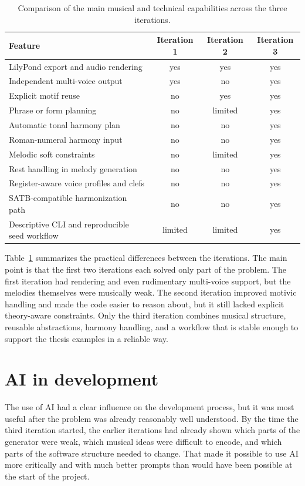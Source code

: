   \begin{table}[h]
    \centering
    \small
    \begin{tabular}{p{}ccc}
      \toprule
      Feature & Iteration 1 & Iteration 2 & Iteration 3 \\
      \midrule
      LilyPond export and audio rendering & yes & yes & yes \\
      Independent multi-voice output & yes & no & yes \\
      Explicit motif reuse & no & yes & yes \\
      Phrase or form planning & no & limited & yes \\
      Automatic tonal harmony plan & no & no & yes \\
      Roman-numeral harmony input & no & no & yes \\
      Melodic soft constraints & no & limited & yes \\
      Rest handling in melody generation & no & no & yes \\
      Register-aware voice profiles and clefs & no & no & yes \\
      SATB-compatible harmonization path & no & no & yes \\
      Descriptive CLI and reproducible seed workflow & limited & limited & yes \\
      \bottomrule
    \end{tabular}
    \caption{Comparison of the main musical and technical capabilities across the three iterations.}\label{tab:iteration_feature_matrix}
  \end{table}

  Table~\ref{tab:iteration_feature_matrix} summarizes the practical differences between the iterations. The main point is that the first two iterations each solved only part of the problem. The first iteration had rendering and even rudimentary multi-voice support, but the melodies themselves were musically weak. The second iteration improved motivic handling and made the code easier to reason about, but it still lacked explicit theory-aware constraints. Only the third iteration combines musical structure, reusable abstractions, harmony handling, and a workflow that is stable enough to support the thesis examples in a reliable way.

\section{\ac{AI} in development}
  The use of \ac{AI} had a clear influence on the development process, but it was most useful after the problem was already reasonably well understood. By the time the third iteration started, the earlier iterations had already shown which parts of the generator were weak, which musical ideas were difficult to encode, and which parts of the software structure needed to change. That made it possible to use \ac{AI} more critically and with much better prompts than would have been possible at the start of the project.

